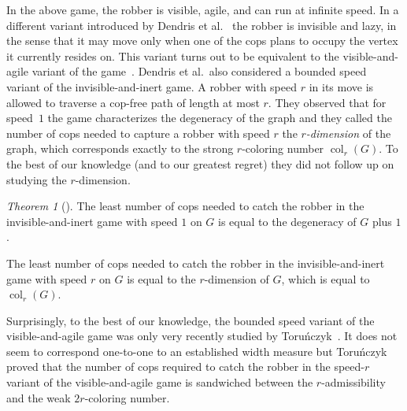 \documentclass[1p,number,a4paper]{elsarticle}
\theoremstyle{remark}
\newcommand{\N}{\mathbb{N}}
\DeclareMathOperator{\copw}{copwidth}
\DeclareMathOperator{\col}{col}
\newtheorem{theorem}{Theorem}[section]
\newtheorem{definition}[theorem]{Definition}
\begin{document}
In the above game, the robber is visible, agile, and can run at infinite speed. 
In a different variant introduced by Dendris et al.~\cite{dendris1997fugitive} the robber is invisible and lazy, in the sense that it may move only when one of the cops plans to occupy the vertex it currently resides on. 
This variant turns out to be equivalent to the 
visible-and-agile variant of the game~\cite{dendris1997fugitive}. Dendris et al.\ also considered a bounded speed variant of the invisible-and-inert game. 
A robber with speed $r$ in its move is allowed to traverse a cop-free path of length at most $r$. 
They observed that for speed~$1$ the game characterizes the degeneracy of the graph and 
they called the number of cops needed to capture a robber with speed $r$ the \emph{$r$-dimension} of the graph, which corresponds exactly to the strong $r$-coloring number $\col_r(G)$. 
To the best of our knowledge (and to our greatest regret) they did not follow up on studying the $r$-dimension. 

\begin{theorem}[\cite{dendris1997fugitive}]
The least number of cops needed to catch the robber 
in the invisible-and-inert game with speed $1$ on $G$ is equal to the degeneracy of $G$ plus $1$.     

\smallskip
The least number of cops needed to catch the robber 
in the invisible-and-inert game with speed $r$ on $G$ is equal to the $r$-dimension of $G$, which is equal to $\col_r(G)$.     
\end{theorem}

Surprisingly, to the best of our knowledge, the bounded speed variant of the visible-and-agile game was only very recently studied by Toru\'nczyk~\cite{torunczyk2023flip}. 
It does not seem to correspond one-to-one to an established width measure but Toru\'nczyk proved that the number of cops required to catch the robber in the speed-$r$ variant of the visible-and-agile game is sandwiched between the $r$-admissibility and the weak $2r$-coloring number. 


\end{document}
